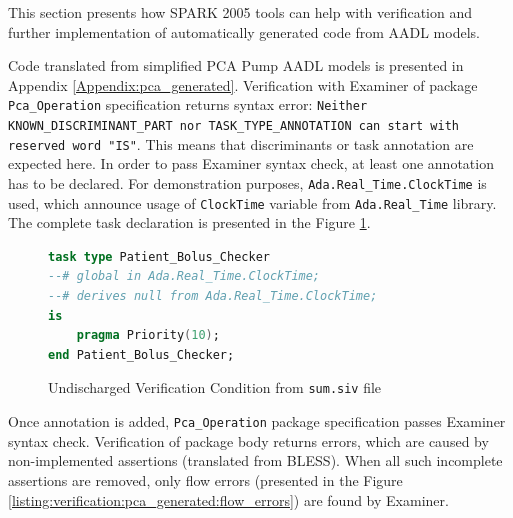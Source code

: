 This section presents how SPARK 2005 tools can help with verification and further implementation of automatically generated code from AADL models.

Code translated from simplified PCA Pump AADL models is presented in Appendix \ref{Appendix:pca_generated}. Verification with Examiner of package \lstinline{Pca_Operation} specification returns syntax error: \lstinline{Neither KNOWN_DISCRIMINANT_PART nor TASK_TYPE_ANNOTATION can start with reserved word "IS"}. This means that discriminants or task annotation are expected here. In order to pass Examiner syntax check, at least one annotation has to be declared. For demonstration purposes, \lstinline{Ada.Real_Time.ClockTime} is used, which announce usage of \lstinline{ClockTime} variable from \lstinline{Ada.Real_Time} library. The complete task declaration is presented in the Figure \ref{listing:verification:pca_generated:patient_bolus_checker}.

\begin{figure}[h]
\singlespacing
\begin{lstlisting}[language=ada, frame=single, gobble=0]
task type Patient_Bolus_Checker
--# global in Ada.Real_Time.ClockTime;
--# derives null from Ada.Real_Time.ClockTime;
is
    pragma Priority(10);
end Patient_Bolus_Checker;
\end{lstlisting}
\doublespacing
\caption{Undischarged Verification Condition from \lstinline{sum.siv} file}
\label{listing:verification:pca_generated:patient_bolus_checker}
\end{figure}

Once annotation is added, \lstinline{Pca_Operation} package specification passes Examiner syntax check. Verification of package body returns errors, which are caused by non-implemented assertions (translated from BLESS). When all such incomplete assertions are removed, only flow errors (presented in the Figure \ref{listing:verification:pca_generated:flow_errors}) are found by Examiner. 

